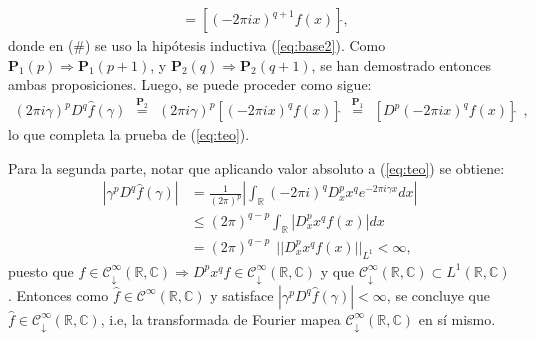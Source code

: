 \documentclass[spanish, fleqn]{article}
\begin{document}
\begin{description}
\begin{align*}
		&= \left[(-2 \pi i x)^{q+1} f(x) \right]\widehat{},
	\end{align*}
	donde en (\#) se uso la hipótesis inductiva (\ref{eq:base2}). Como $\mathbf{P}_1(p)\Rightarrow \mathbf{P}_1(p+1)$,
	y $\mathbf{P}_2(q) \Rightarrow \mathbf{P}_2(q+1)$, se han demostrado entonces ambas proposiciones. Luego, se puede proceder como sigue:
	\begin{align*}
		(2 \pi i \gamma)^p D^q \widehat{f}(\gamma) \ \ \stackrel{\mathbf{P}_2}{=} \ \ (2 \pi i \gamma)^p \left[ (-2 \pi i x)^q f(x) \right]\widehat{} \ \ \stackrel{\mathbf{P}_1}{=} \ \ \left[ D^p (-2 \pi i x)^q f(x) \right]\widehat{}\ \ ,
	\end{align*}
	lo que completa la prueba de (\ref{eq:teo}).

	Para la segunda parte, notar que aplicando valor absoluto a (\ref{eq:teo}) se obtiene:
	\begin{align*}
		\left|\gamma^p D^q \widehat{f}(\gamma)\right| &= \frac{1}{(2 \pi)^p} \left| \int_{\mathbb{R}} (-2 \pi i)^q D_{x}^{p} x^q e^{-2 \pi i \gamma x} dx \right| \\
		&\leq (2 \pi)^{q-p} \int_{\mathbb{R}} \left| D_{x}^{p} x^q f(x) \right| dx \\
		&= (2 \pi)^{q-p} \ \ ||D_{x}^p x^q f(x)||_{L^1} < \infty,
	\end{align*}
	puesto que $f \in \mathcal{C}_{\downarrow}^\infty(\mathbb{R},\mathbb{C}) \Rightarrow  D^p x^q f \in \mathcal{C}_{\downarrow}^\infty(\mathbb{R},\mathbb{C})$ y que $\mathcal{C}_{\downarrow}^\infty(\mathbb{R},\mathbb{C}) \subset L^1(\mathbb{R},\mathbb{C})$. Entonces como $\widehat{f} \in \mathcal{C}^\infty(\mathbb{R},\mathbb{C})$ y satisface $\left|\gamma^p D^q \widehat{f}(\gamma)\right| < \infty$, se concluye que $\widehat{f} \in \mathcal{C}_{\downarrow}^\infty(\mathbb{R},\mathbb{C})$, i.e, la transformada de Fourier mapea $\mathcal{C}_{\downarrow}^\infty(\mathbb{R},\mathbb{C})$ en sí mismo.





\end{description}
\end{document}
